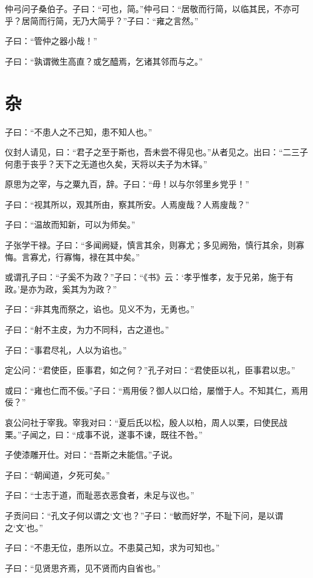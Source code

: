 \documentclass[a5paper]{ctexbook}
\begin{document}
    仲弓问子桑伯子。子曰：“可也，简。”仲弓曰：“居敬而行简，以临其民，不亦可乎？居简而行简，无乃大简乎？”子曰：“雍之言然。”

    子曰：“管仲之器小哉！”

    子曰：“孰谓微生高直？或乞醯焉，乞诸其邻而与之。”

    \chapter{杂}

    子曰：“不患人之不己知，患不知人也。”

    仪封人请见，曰：“君子之至于斯也，吾未尝不得见也。”从者见之。出曰：“二三子何患于丧乎？天下之无道也久矣，天将以夫子为木铎。”

    原思为之宰，与之粟九百，辞。子曰：“毋！以与尔邻里乡党乎！”

    子曰：“视其所以，观其所由，察其所安。人焉廋哉？人焉廋哉？”

    子曰：“温故而知新，可以为师矣。”

    

    子张学干禄。子曰：“多闻阙疑，慎言其余，则寡尤；多见阙殆，慎行其余，则寡悔。言寡尤，行寡悔，禄在其中矣。”

    或谓孔子曰：“子奚不为政？”子曰：“《书》云：‘孝乎惟孝，友于兄弟，施于有政。’是亦为政，奚其为为政？”

    子曰：“非其鬼而祭之，谄也。见义不为，无勇也。”

    子曰：“射不主皮，为力不同科，古之道也。”

    子曰：“事君尽礼，人以为谄也。”

    定公问：“君使臣，臣事君，如之何？”孔子对曰：“君使臣以礼，臣事君以忠。”

    或曰：“雍也仁而不佞。”子曰：“焉用佞？御人以口给，屡憎于人。不知其仁，焉用佞？”

    哀公问社于宰我。宰我对曰：“夏后氏以松，殷人以柏，周人以栗，曰使民战栗。”子闻之，曰：“成事不说，遂事不谏，既往不咎。”

    子使漆雕开仕。对曰：“吾斯之未能信。”子说。
    
    子曰：“朝闻道，夕死可矣。”
    
    子曰：“士志于道，而耻恶衣恶食者，未足与议也。”

    子贡问曰：“孔文子何以谓之‘文’也？”子曰：“敏而好学，不耻下问，是以谓之‘文’也。”

    子曰：“不患无位，患所以立。不患莫己知，求为可知也。”

    子曰：“见贤思齐焉，见不贤而内自省也。”
\end{document}
